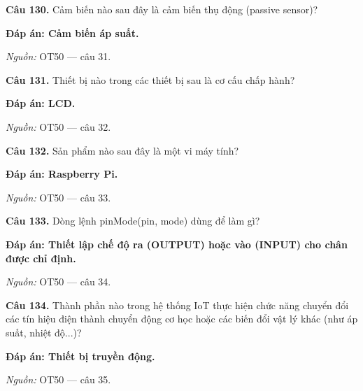 \documentclass[11pt,a4paper]{article}
\begin{document}
\textbf{Câu 130.} Cảm biến nào sau đây là cảm biến thụ động (passive sensor)?\par
{\color{answer}\textbf{Đáp án: Cảm biến áp suất.}}\par
{\footnotesize\color{sourcegray}\textit{Nguồn:} OT50 — câu 31.\par}
\vspace{3pt}\par\noindent{\color{black!18}\rule{\linewidth}{0.3pt}}\par\medskip

\textbf{Câu 131.} Thiết bị nào trong các thiết bị sau là cơ cấu chấp hành?\par
{\color{answer}\textbf{Đáp án: LCD.}}\par
{\footnotesize\color{sourcegray}\textit{Nguồn:} OT50 — câu 32.\par}
\vspace{3pt}\par\noindent{\color{black!18}\rule{\linewidth}{0.3pt}}\par\medskip

\textbf{Câu 132.} Sản phẩm nào sau đây là một vi máy tính?\par
{\color{answer}\textbf{Đáp án: Raspberry Pi.}}\par
{\footnotesize\color{sourcegray}\textit{Nguồn:} OT50 — câu 33.\par}
\vspace{3pt}\par\noindent{\color{black!18}\rule{\linewidth}{0.3pt}}\par\medskip

\textbf{Câu 133.} Dòng lệnh pinMode(pin, mode) dùng để làm gì?\par
{\color{answer}\textbf{Đáp án: Thiết lập chế độ ra (OUTPUT) hoặc vào (INPUT) cho chân được chỉ định.}}\par
{\footnotesize\color{sourcegray}\textit{Nguồn:} OT50 — câu 34.\par}
\vspace{3pt}\par\noindent{\color{black!18}\rule{\linewidth}{0.3pt}}\par\medskip

\textbf{Câu 134.} Thành phần nào trong hệ thống IoT thực hiện chức năng chuyển đổi các tín hiệu điện thành chuyển động cơ học hoặc các biến đổi vật lý khác (như áp suất, nhiệt độ...)?\par
{\color{answer}\textbf{Đáp án: Thiết bị truyền động.}}\par
{\footnotesize\color{sourcegray}\textit{Nguồn:} OT50 — câu 35.\par}
\vspace{3pt}\par\noindent{\color{black!18}\rule{\linewidth}{0.3pt}}\par\medskip
\end{document}
